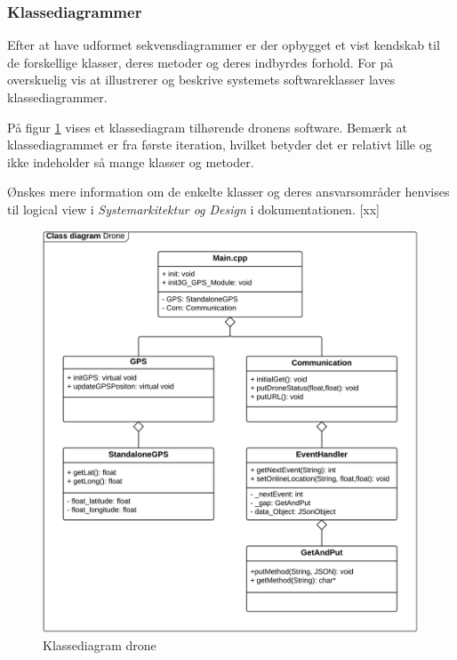 \newpage
\subsubsection*{Klassediagrammer}
\vspace{-0.3cm}	

Efter at have udformet sekvensdiagrammer er der opbygget et vist kendskab til de forskellige klasser, deres metoder og deres indbyrdes forhold. For på overskuelig vis at illustrerer og beskrive systemets softwareklasser laves klassediagrammer.

På figur \ref{fig:class_drone} vises et klassediagram tilhørende dronens software. Bemærk at klassediagrammet er fra første iteration, hvilket betyder det er relativt lille og ikke indeholder så mange klasser og metoder.

Ønskes mere information om de enkelte klasser og deres ansvarsområder henvises til logical view i \textit{Systemarkitektur og Design} i dokumentationen. [xx]

\begin{figure}[H]
	\centering
	\includegraphics[width=1\textwidth]{Billeder/classdiagram.png}
	\vspace{-0.6cm}	
	\caption{Klassediagram drone}
	\label{fig:class_drone}
\end{figure}

